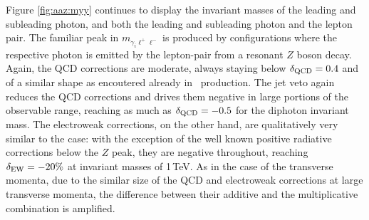 Figure \ref{fig:aaz:myy} continues to display the invariant masses 
of the leading and subleading photon, and both the leading and 
subleading photon and the lepton pair. 
The familiar peak in $m_{\gamma_i\ell^+\ell^-}$ is produced by 
configurations where the respective photon is emitted by the 
lepton-pair from a resonant $Z$ boson decay. 
Again, the QCD corrections are moderate, always staying below 
$\delta_\text{QCD}=0.4$ and of a similar shape as encoutered already in 
\aaw\ production. 
The jet veto again reduces the QCD corrections and drives them negative 
in large portions of the observable range, reaching as much as 
$\delta_\text{QCD}=-0.5$ for the diphoton invariant mass. 
The electroweak corrections, on the other hand, are qualitatively very similar 
to the \aaw case: with the exception of the well known positive 
radiative corrections below the $Z$ peak, they are negative 
throughout, reaching $\delta_\text{EW}=-20\%$ at invariant masses of 
1\,TeV.
As in the case of the transverse momenta, due to the similar size 
of the QCD and electroweak corrections at large transverse 
momenta, the difference between their additive and the multiplicative 
combination is amplified.

